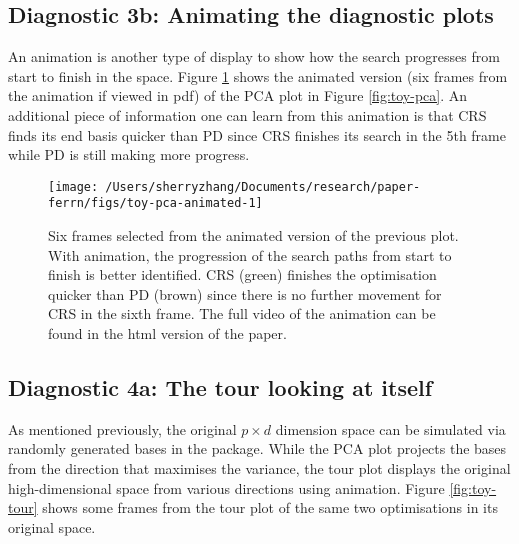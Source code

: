 \hypertarget{diagnostic-3b-animating-the-diagnostic-plots}{%
\subsection{Diagnostic 3b: Animating the diagnostic
plots}\label{diagnostic-3b-animating-the-diagnostic-plots}}

An animation is another type of display to show how the search
progresses from start to finish in the space. Figure
\ref{fig:toy-pca-animated} shows the animated version (six frames from
the animation if viewed in pdf) of the PCA plot in Figure
\ref{fig:toy-pca}. An additional piece of information one can learn from
this animation is that CRS finds its end basis quicker than PD since CRS
finishes its search in the 5th frame while PD is still making more
progress.

\begin{Schunk}
\begin{figure}

{\centering \texttt{[image: /Users/sherryzhang/Documents/research/paper-ferrn/figs/toy-pca-animated-1]} 

}

\caption[Six frames selected from the animated version of the previous plot]{Six frames selected from the animated version of the previous plot. With animation, the progression of the search paths from start to finish is better identified. CRS (green) finishes the optimisation quicker than PD (brown) since there is no further movement for CRS in the sixth frame. The full video of the animation can be found in the html version of the paper.}\label{fig:toy-pca-animated}
\end{figure}
\end{Schunk}

\hypertarget{diagnostic-4a-the-tour-looking-at-itself}{%
\subsection{Diagnostic 4a: The tour looking at
itself}\label{diagnostic-4a-the-tour-looking-at-itself}}

As mentioned previously, the original \(p \times d\) dimension space can
be simulated via randomly generated bases in the 
\citep{geozoo} package. While the PCA plot projects the bases from the
direction that maximises the variance, the tour plot displays the
original high-dimensional space from various directions using animation.
Figure \ref{fig:toy-tour} shows some frames from the tour plot of the
same two optimisations in its original space.

